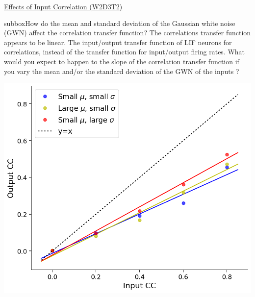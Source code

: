 \begin{textbox}{\href{https://compneuro.neuromatch.io/tutorials/W1D4_GeneralizedLinearModels/student/W1D4_Tutorial1.html}{Effects of Input Correlation (W2D3T2)} }


\begin{subbox}{subbox}{How do the mean and standard deviation of the Gaussian white noise (GWN) affect the correlation transfer function?}
\scriptsize
The correlations transfer function appears to be linear. The input/output transfer function of LIF neurons for correlations, instead of the transfer function for input/output firing rates.
What would you expect to happen to the slope of the correlation transfer function if you vary the mean and/or the standard deviation of the GWN of the inputs ?
\begin{center}
    
\includegraphics[scale=0.25]{Figures/BNM/LIF_Figure8.png}
\end{center}


\end{subbox}
\end{textbox}
